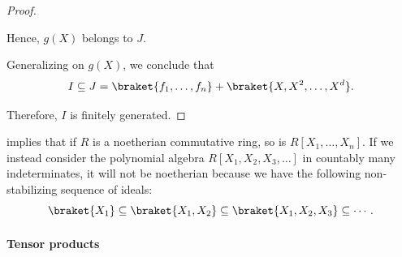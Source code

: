 \begin{proof}
\begin{itemize}
    Hence, \( g(X) \) belongs to \( J \).
  \end{itemize}

  Generalizing on \( g(X) \), we conclude that
  \begin{equation*}
    I \subseteq J = \braket{ f_1, \ldots, f_n } + \braket{ X, X^2, \ldots, X^d }.
  \end{equation*}

  Therefore, \( I \) is finitely generated.
\end{proof}

\begin{example}\label{ex:countable_indeterminates_non_noetherian}
   implies that if \( R \) is a noetherian commutative ring, so is \( R[X_1, \ldots, X_n] \). If we instead consider the polynomial algebra \( R[X_1, X_2, X_3, \ldots] \) in countably many indeterminates, it will not be noetherian because we have the following non-stabilizing sequence of ideals:
  \begin{equation*}
    \braket{ X_1 } \subseteq \braket{ X_1, X_2 } \subseteq \braket{ X_1, X_2, X_3 } \subseteq \cdots.
  \end{equation*}
\end{example}

\paragraph{Tensor products}

\begin{definition}\label{def:module_tensor_product}
\end{definition}
